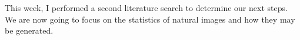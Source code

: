 \documentclass[../notebook.tex]{subfiles}
\begin{document}
\label{sec:sum6}

This week, I performed a second literature search to determine our next steps.
We are now going to focus on the statistics of natural images and how they may
be generated.
\end{document}
